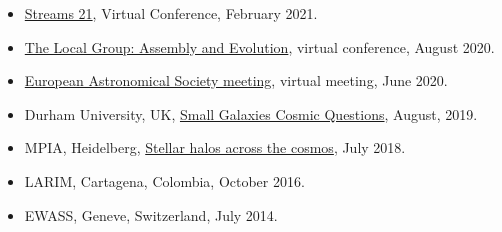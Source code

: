 \documentclass[14pt]{article}
\begin{document}
\begin{itemize}
\item \href{https://stellarstreams.org/streams21/}{Streams 21}, Virtual
  Conference, February 2021. 
\item  \href{https://www.stsci.edu/contents/events/stsci/2020/april/the-local-group-assembly-and-evolution?page=2&filterUUID=6fedb8a7-}{The Local Group: Assembly and Evolution}, virtual conference, August 2020.
\item \href{https://eas.unige.ch/EAS2020/}{European Astronomical Society meeting}, virtual meeting, June 2020.
\item Durham University, UK, \href{http://astro.dur.ac.uk/cosmodwarfs/}{Small Galaxies Cosmic Questions}, August, 2019.
\item MPIA, Heidelberg, \href{http://www.mpia.de/homes/stellarhalos2018-loc/sh2018/index.html}{Stellar halos across the cosmos}, July 2018.
\item LARIM, Cartagena, Colombia, October 2016.
\item EWASS, Geneve, Switzerland, July 2014.
\end{itemize}
  
\end{document}
